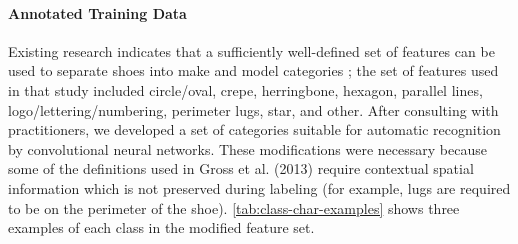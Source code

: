 \documentclass{article}\usepackage[]{graphicx}\usepackage[table]{xcolor}
\begin{document}
\paragraph{Annotated Training Data}
Existing research indicates that a sufficiently well-defined set of features can be used to separate shoes into make and model categories \citep{grossVariabilitySignificanceClass2013}; the set of features used in that study included circle/oval, crepe, herringbone, hexagon, parallel lines, logo/lettering/numbering, perimeter lugs, star, and other. After consulting with practitioners, we developed a set of categories suitable for automatic recognition by convolutional neural networks. These modifications were necessary because some of the definitions used in Gross et al. (2013) require contextual spatial information which is not preserved during labeling (for example, lugs are required to be on the perimeter of the shoe). \autoref{tab:class-char-examples} shows three examples of each class in the modified feature set.
\end{document}
